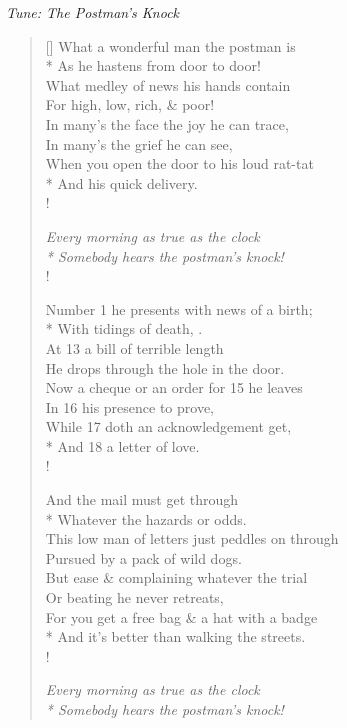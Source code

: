 \documentclass[MAIN]{subfiles}
\begin{document}
\begin{center}
\emph{Tune: The Postman's Knock}
\end{center}

\bigskip

\settowidth{\versewidth}{When you open the door to his loud rat-tat}
\begin{verse}[\versewidth]
What a wonderful man the postman is\\*
As he hastens from door to door!\\
What medley of news his hands contain\\
For high, low, rich, \& poor!\\
In many's the face the joy he can trace,\\
In many's the grief he can see,\\
When you open the door to his loud rat-tat\\*
And his quick delivery.\\!

{\it Every morning as true as the clock\\*
Somebody hears the postman's knock!}\\!

Number 1 he presents with news of a birth;\\*
With tidings of death, .\\
At 13 a bill of terrible length\\
He drops through the hole in the door.\\
Now a cheque or an order for 15 he leaves\\
In 16 his presence to prove,\\
While 17 doth an acknowledgement get,\\*
And 18 a letter of love.\\!

And the mail must get through\\*
Whatever the hazards or odds.\\
This low man of letters just peddles on through\\
Pursued by a pack of wild dogs.\\
But ease \& complaining whatever the trial\\
Or beating he never retreats,\\
For you get a free bag \& a hat with a badge\\*
And it's better than walking the streets.\\!

{\it Every morning as true as the clock\\*
Somebody hears the postman's knock!}
\end{verse}
\end{document}
